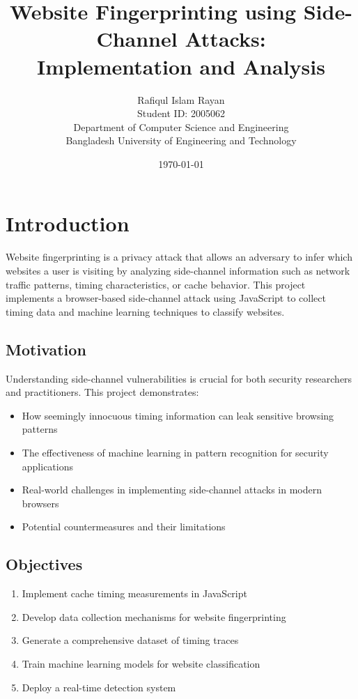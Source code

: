 \documentclass[11pt,a4paper]{article}
\title{\textbf{Website Fingerprinting using Side-Channel Attacks:\\ Implementation and Analysis}}
\author{
    Rafiqul Islam Rayan \\
    Student ID: 2005062 \\
    Department of Computer Science and Engineering \\
    Bangladesh University of Engineering and Technology
}
\date{\today}
\begin{document}
\maketitle


\tableofcontents
\newpage

\section{Introduction}

Website fingerprinting is a privacy attack that allows an adversary to infer which websites a user is visiting by analyzing side-channel information such as network traffic patterns, timing characteristics, or cache behavior. This project implements a browser-based side-channel attack using JavaScript to collect timing data and machine learning techniques to classify websites.

\subsection{Motivation}
Understanding side-channel vulnerabilities is crucial for both security researchers and practitioners. This project demonstrates:
\begin{itemize}
    \item How seemingly innocuous timing information can leak sensitive browsing patterns
    \item The effectiveness of machine learning in pattern recognition for security applications  
    \item Real-world challenges in implementing side-channel attacks in modern browsers
    \item Potential countermeasures and their limitations
\end{itemize}

\subsection{Objectives}
\begin{enumerate}
    \item Implement cache timing measurements in JavaScript
    \item Develop data collection mechanisms for website fingerprinting
    \item Generate a comprehensive dataset of timing traces
    \item Train machine learning models for website classification
    \item Deploy a real-time detection system
\end{enumerate}
\end{document}
